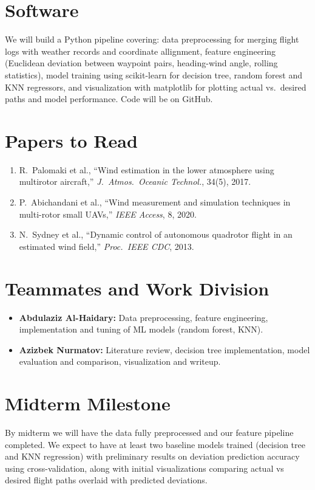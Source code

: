\documentclass[11pt]{article}
\begin{document}
\section{Software}

We will build a Python pipeline covering: data preprocessing for merging flight logs with weather records and coordinate allignment, feature engineering (Euclidean deviation between waypoint pairs, heading-wind angle, rolling statistics), model training using scikit-learn for decision tree, random forest and KNN regressors, and visualization with matplotlib for plotting actual vs.\ desired paths and model performance. Code will be on GitHub.

\section{Papers to Read}

\begin{enumerate}
    \item R.\ Palomaki et al., ``Wind estimation in the lower atmosphere using multirotor aircraft,'' \textit{J.\ Atmos.\ Oceanic Technol.}, 34(5), 2017.
    \item P.\ Abichandani et al., ``Wind measurement and simulation techniques in multi-rotor small UAVs,'' \textit{IEEE Access}, 8, 2020.
    \item N.\ Sydney et al., ``Dynamic control of autonomous quadrotor flight in an estimated wind field,'' \textit{Proc.\ IEEE CDC}, 2013.
\end{enumerate}

\section{Teammates and Work Division}

\begin{itemize}
    \item \textbf{Abdulaziz Al-Haidary:} Data preprocessing, feature engineering, implementation and tuning of ML models (random forest, KNN).
    \item \textbf{Azizbek Nurmatov:} Literature review, decision tree implementation, model evaluation and comparison, visualization and writeup.
\end{itemize}

\section{Midterm Milestone}

By midterm we will have the data fully preprocessed and our feature pipeline completed. We expect to have at least two baseline models trained (decision tree and KNN regression) with preliminary results on deviation prediction accuracy using cross-validation, along with initial visualizations comparing actual vs desired flight paths overlaid with predicted deviations.
\end{document}
